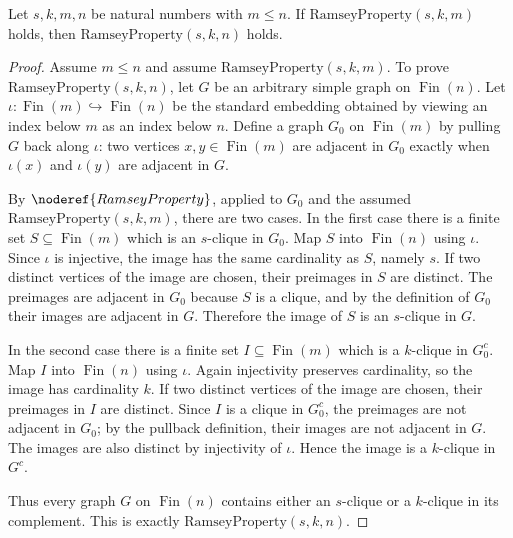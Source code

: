 \begin{helper}
Let \(s,k,m,n\) be natural numbers with \(m\le n\).  If
\(\mathrm{RamseyProperty}(s,k,m)\) holds, then
\(\mathrm{RamseyProperty}(s,k,n)\) holds.
\end{helper}
\begin{proof}
Assume \(m\le n\) and assume \(\mathrm{RamseyProperty}(s,k,m)\).  To prove
\(\mathrm{RamseyProperty}(s,k,n)\), let \(G\) be an arbitrary simple graph on
\(\operatorname{Fin}(n)\).  Let
\(\iota:\operatorname{Fin}(m)\hookrightarrow \operatorname{Fin}(n)\) be the
standard embedding obtained by viewing an index below \(m\) as an index below
\(n\).  Define a graph \(G_{0}\) on \(\operatorname{Fin}(m)\) by pulling \(G\)
back along \(\iota\): two vertices \(x,y\in\operatorname{Fin}(m)\) are adjacent
in \(G_{0}\) exactly when \(\iota(x)\) and \(\iota(y)\) are adjacent in \(G\).

By \(\noderef{RamseyProperty}\), applied to \(G_{0}\) and the assumed
\(\mathrm{RamseyProperty}(s,k,m)\), there are two cases.  In the first case
there is a finite set \(S\subseteq\operatorname{Fin}(m)\) which is an
\(s\)-clique in \(G_{0}\).  Map \(S\) into \(\operatorname{Fin}(n)\) using
\(\iota\).  Since \(\iota\) is injective, the image has the same cardinality as
\(S\), namely \(s\).  If two distinct vertices of the image are chosen, their
preimages in \(S\) are distinct.  The preimages are adjacent in \(G_{0}\)
because \(S\) is a clique, and by the definition of \(G_{0}\) their images are
adjacent in \(G\).  Therefore the image of \(S\) is an \(s\)-clique in \(G\).

In the second case there is a finite set
\(I\subseteq\operatorname{Fin}(m)\) which is a \(k\)-clique in \(G_{0}^{c}\).
Map \(I\) into \(\operatorname{Fin}(n)\) using \(\iota\).  Again injectivity
preserves cardinality, so the image has cardinality \(k\).  If two distinct
vertices of the image are chosen, their preimages in \(I\) are distinct.  Since
\(I\) is a clique in \(G_{0}^{c}\), the preimages are not adjacent in
\(G_{0}\); by the pullback definition, their images are not adjacent in \(G\).
The images are also distinct by injectivity of \(\iota\).  Hence the image is a
\(k\)-clique in \(G^{c}\).

Thus every graph \(G\) on \(\operatorname{Fin}(n)\) contains either an
\(s\)-clique or a \(k\)-clique in its complement.  This is exactly
\(\mathrm{RamseyProperty}(s,k,n)\).
\end{proof}
